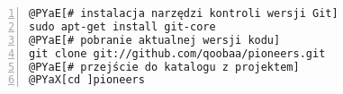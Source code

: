 \begin{Verbatim}[commandchars=@\[\],numbers=left,firstnumber=1,stepnumber=1]
@PYaE[# instalacja narzędzi kontroli wersji Git]
sudo apt-get install git-core
@PYaE[# pobranie aktualnej wersji kodu]
git clone git://github.com/qoobaa/pioneers.git
@PYaE[# przejście do katalogu z projektem]
@PYaX[cd ]pioneers
\end{Verbatim}
